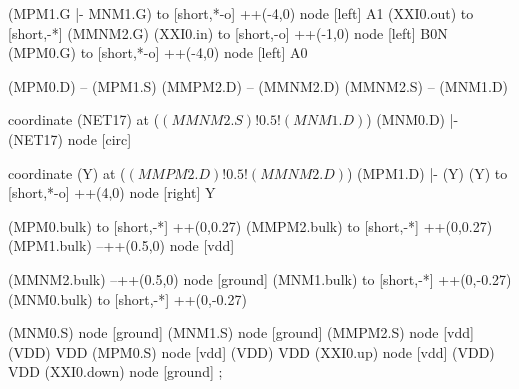 \begin{circuitikz}[american]
	(MPM1.G |- MNM1.G) to [short,*-o] ++(-4,0) node [left] {A1}
	(XXI0.out) to [short,-*] (MMNM2.G)
	(XXI0.in) to [short,-o] ++(-1,0) node [left] {B0N}
	(MPM0.G) to [short,*-o] ++(-4,0) node [left] {A0}
	
	(MPM0.D) -- (MPM1.S)
	(MMPM2.D) -- (MMNM2.D)
	(MMNM2.S) -- (MNM1.D)
	
	coordinate (NET17) at ($(MMNM2.S)!0.5!(MNM1.D)$)
	(MNM0.D) |- (NET17) node [circ] {}
	
	coordinate (Y) at ($(MMPM2.D)!0.5!(MMNM2.D)$)
	(MPM1.D) |- (Y)
	(Y) to [short,*-o] ++(4,0) node [right] {Y}
	
	(MPM0.bulk) to [short,-*] ++(0,0.27)
	(MMPM2.bulk) to [short,-*] ++(0,0.27)	
	(MPM1.bulk) --++(0.5,0) node [vdd]{}
	
	(MMNM2.bulk) --++(0.5,0) node [ground]{}
	(MNM1.bulk) to [short,-*] ++(0,-0.27) 
	(MNM0.bulk) to [short,-*] ++(0,-0.27) 


	(MNM0.S) node [ground] {}
	(MNM1.S) node [ground] {}
	(MMPM2.S) node [vdd] (VDD) {VDD}
	(MPM0.S) node [vdd] (VDD) {VDD}
	(XXI0.up) node [vdd] (VDD) {VDD}
	(XXI0.down) node [ground] {}
;

\end{circuitikz}
